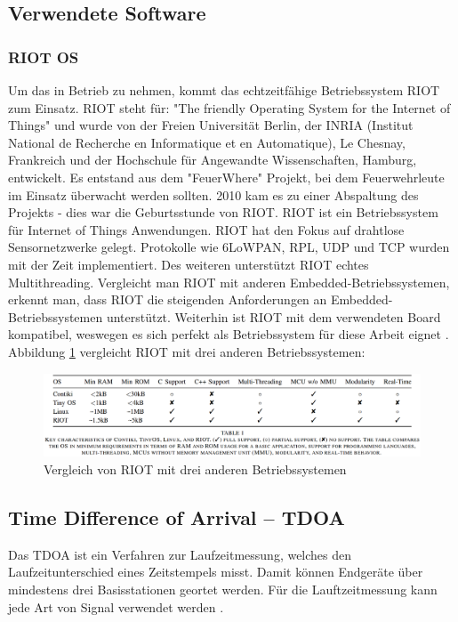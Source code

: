 \subsection{Verwendete Software}
\subsubsection{RIOT OS}
Um das \board \platz in Betrieb zu nehmen, kommt das echtzeitfähige Betriebssystem RIOT zum Einsatz. RIOT steht für: "The friendly Operating System for the Internet of Things" und wurde von der Freien Universität Berlin, der INRIA (Institut National de Recherche en Informatique et en Automatique), Le Chesnay, Frankreich und der Hochschule für Angewandte Wissenschaften, Hamburg, entwickelt. Es entstand aus dem "FeuerWhere" Projekt, bei dem Feuerwehrleute im Einsatz überwacht werden sollten. 2010 kam es zu einer Abspaltung des Projekts - dies war die Geburtsstunde von RIOT. RIOT ist ein Betriebssystem für Internet of Things Anwendungen. RIOT hat den Fokus auf drahtlose Sensornetzwerke gelegt. Protokolle wie 6LoWPAN, RPL, UDP und TCP wurden mit der Zeit implementiert. Des weiteren unterstützt RIOT echtes Multithreading. Vergleicht man RIOT mit anderen Embedded-Betriebssystemen, erkennt man, dass RIOT die steigenden Anforderungen an Embedded-Betriebssystemen unterstützt. Weiterhin ist RIOT mit dem verwendeten Board \board \platz kompatibel, weswegen es sich perfekt als Betriebssystem für diese Arbeit eignet \cite{src_RIOT}. Abbildung \ref{img:vergleich} vergleicht RIOT mit drei anderen Betriebssystemen:

\begin{figure}[H]
        \centering
		\hspace*{-1.5cm}
        \includegraphics[width=1.2\textwidth]{images/vergleich.png}
        \caption{Vergleich von RIOT mit drei anderen Betriebssystemen}
        \label{img:vergleich}
\end{figure}

\subsection{Time Difference of Arrival -- TDOA}
Das TDOA ist ein Verfahren zur Laufzeitmessung, welches den Laufzeitunterschied eines Zeitstempels misst. Damit können Endgeräte über mindestens drei Basisstationen geortet werden. Für die Lauftzeitmessung kann jede Art von Signal verwendet werden \cite{src_TDOA}.

